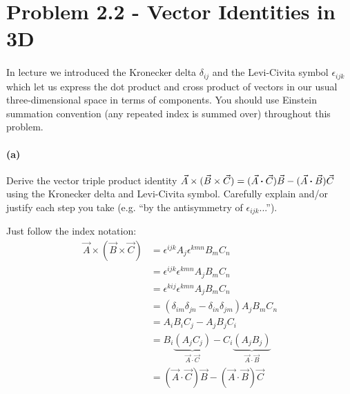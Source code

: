 \documentclass{article}
\begin{document}
\section*{Problem 2.2 - Vector Identities in 3D}

\paragraph{}

In lecture we introduced the Kronecker delta $\delta_{ij}$ and the Levi-Civita symbol $\epsilon_{ijk}$ which let us express the dot product and cross product of
vectors in our usual three-dimensional space in terms of components.  You should use Einstein summation convention (any repeated index is summed over)
throughout this problem.

\paragraph{(a)}
Derive the vector triple product identity $\vec{A}\times(\vec{B}\times\vec{C}) = (\vec{A}\boldsymbol{\cdot}\vec{C})\vec{B} - (\vec{A}\boldsymbol{\cdot}\vec{B})\vec{C}$
using the Kronecker delta and Levi-Civita symbol.  Carefully explain and/or justify each step you take (e.g. ``by the antisymmetry of $\epsilon_{ijk}$...'').

\begin{solution}
    Just follow the index notation:
    \begin{align*}
        \vec A \times (\vec B \times \vec C) &= \epsilon^{ijk}A_j\epsilon^{kmn} B_mC_n \\
        &= \epsilon^{ijk}\epsilon^{kmn} A_j B_m C_n\\
        &= \epsilon^{kij}\epsilon^{kmn} A_j B_m C_n\\
        &= (\delta_{im} \delta_{jn} - \delta_{in}\delta_{jm}) A_j B_m C_n\\
        &= A_i B_i C_j - A_j B_j C_i\\
        &= B_i\underbrace{(A_j C_j)}_{\vec A \cdot \vec C} - C_i\underbrace{(A_j B_j)}_{\vec A \cdot \vec B}\\
        &= (\vec A \cdot \vec C)\vec B - (\vec A \cdot \vec B)\vec C
    \end{align*}
\end{solution}
\end{document}
